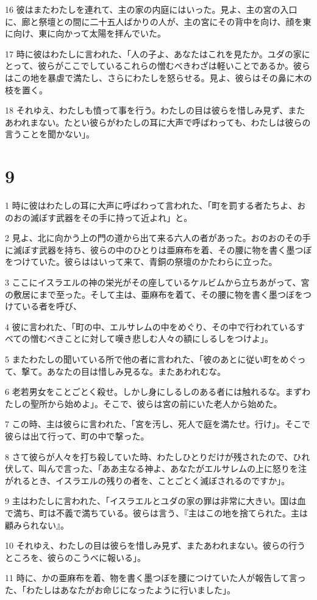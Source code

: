 \par 16 彼はまたわたしを連れて、主の家の内庭にはいった。見よ、主の宮の入口に、廊と祭壇との間に二十五人ばかりの人が、主の宮にその背中を向け、顔を東に向け、東に向かって太陽を拝んでいた。
\par 17 時に彼はわたしに言われた、「人の子よ、あなたはこれを見たか。ユダの家にとって、彼らがここでしているこれらの憎むべきわざは軽いことであるか。彼らはこの地を暴虐で満たし、さらにわたしを怒らせる。見よ、彼らはその鼻に木の枝を置く。
\par 18 それゆえ、わたしも憤って事を行う。わたしの目は彼らを惜しみ見ず、またあわれまない。たとい彼らがわたしの耳に大声で呼ばわっても、わたしは彼らの言うことを聞かない」。

\chapter{9}

\par 1 時に彼はわたしの耳に大声に呼ばわって言われた、「町を罰する者たちよ、おのおの滅ぼす武器をその手に持って近よれ」と。
\par 2 見よ、北に向かう上の門の道から出て来る六人の者があった。おのおのその手に滅ぼす武器を持ち、彼らの中のひとりは亜麻布を着、その腰に物を書く墨つぼをつけていた。彼らははいって来て、青銅の祭壇のかたわらに立った。
\par 3 ここにイスラエルの神の栄光がその座しているケルビムから立ちあがって、宮の敷居にまで至った。そして主は、亜麻布を着て、その腰に物を書く墨つぼをつけている者を呼び、
\par 4 彼に言われた、「町の中、エルサレムの中をめぐり、その中で行われているすべての憎むべきことに対して嘆き悲しむ人々の額にしるしをつけよ」。
\par 5 またわたしの聞いている所で他の者に言われた、「彼のあとに従い町をめぐって、撃て。あなたの目は惜しみ見るな。またあわれむな。
\par 6 老若男女をことごとく殺せ。しかし身にしるしのある者には触れるな。まずわたしの聖所から始めよ」。そこで、彼らは宮の前にいた老人から始めた。
\par 7 この時、主は彼らに言われた、「宮を汚し、死人で庭を満たせ。行け」。そこで彼らは出て行って、町の中で撃った。
\par 8 さて彼らが人々を打ち殺していた時、わたしひとりだけが残されたので、ひれ伏して、叫んで言った、「ああ主なる神よ、あなたがエルサレムの上に怒りを注がれるとき、イスラエルの残りの者を、ことごとく滅ぼされるのですか」。
\par 9 主はわたしに言われた、「イスラエルとユダの家の罪は非常に大きい。国は血で満ち、町は不義で満ちている。彼らは言う、『主はこの地を捨てられた。主は顧みられない』。
\par 10 それゆえ、わたしの目は彼らを惜しみ見ず、またあわれまない。彼らの行うところを、彼らのこうべに報いる」。
\par 11 時に、かの亜麻布を着、物を書く墨つぼを腰につけていた人が報告して言った、「わたしはあなたがお命じになったように行いました」。

